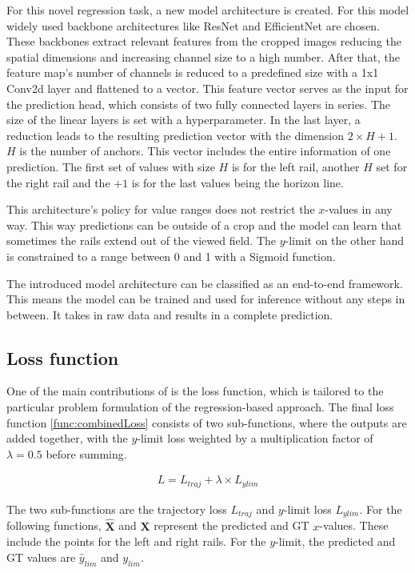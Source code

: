 For this novel regression task, a new model architecture is created.
For this model widely used backbone architectures like ResNet and EfficientNet are chosen.
These backbones extract relevant features from the cropped images reducing the spatial dimensions and increasing channel size to a high number.
After that, the feature map's number of channels is reduced to a predefined size with a 1x1 Conv2d layer \cite{pytorch_conv2d_docu} and flattened to a vector.
This feature vector serves as the input for the prediction head, which consists of two fully connected layers \cite{pytorch_linearLayer_docu} in series.
The size of the linear layers is set with a hyperparameter.
In the last layer, a reduction leads to the resulting prediction vector with the dimension $2 \times H + 1$.
$H$ is the number of anchors.
This vector includes the entire information of one prediction.
The first set of values with size $H$ is for the left rail, another $H$ set for the right rail and the $+ 1$ is for the last values being the horizon line.

This architecture's policy for value ranges does not restrict the $x$-values in any way.
This way predictions can be outside of a crop and the model can learn that sometimes the rails extend out of the viewed field.
The $y$-limit on the other hand is constrained to a range between 0 and 1 with a Sigmoid function.

The introduced model architecture can be classified as an end-to-end framework.
This means the model can be trained and used for inference without any steps in between.
It takes in raw data and results in a complete prediction.

\subsection{Loss function}

One of the main contributions of \cite{tepNet2024} is the loss function, which is tailored to the particular problem formulation of the regression-based approach.
The final loss function \autoref{func:combinedLoss} \cite{tepNet2024} consists of two sub-functions, where the outputs are added together, with the $y$-limit loss weighted by a multiplication factor of $\lambda=0.5$ before summing.

\begin{align}
    L = L_{traj} + \lambda \times L_{ylim}
    \label{func:combinedLoss}
\end{align}

The two sub-functions are the trajectory loss $L_{traj}$ and $y$-limit loss $L_{ylim}$.
For the following functions, $\hat{\mathbf{X}}$ and $\mathbf{X}$ represent the predicted and \ac{GT} $x$-values.
These include the points for the left and right rails.
For the $y$-limit, the predicted and \ac{GT} values are $\hat{y}_{lim}$ and $y_{lim}$.

